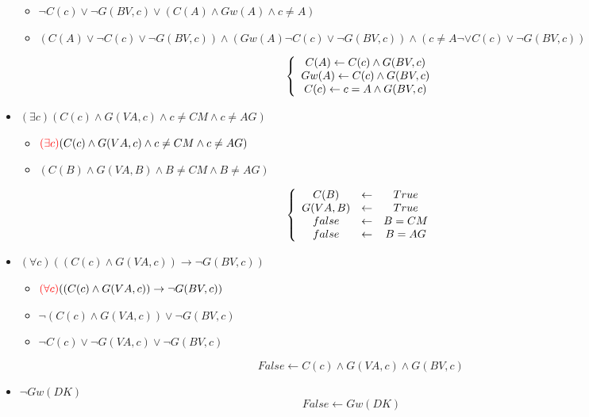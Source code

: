 \documentclass[alternative-exam.tex]{subfiles}
\begin{document}
\begin{itemize}
\begin{itemize}
\item $\neg C(c) \vee \neg G(BV,c) \vee (C(A) \wedge Gw(A) \wedge c \neq A)$

\item 
$(C(A)\vee \neg C(c) \vee \neg G(BV,c)) \wedge (Gw(A) \neg C(c) \vee \neg G(BV,c))\wedge (c \neq A\neg \vee C(c) \vee \neg G(BV,c))$

\[
\left\{
\begin{array}{c c c}
C(A)\leftarrow  C(c) \wedge  G(BV,c)\\
Gw(A) \leftarrow  C(c) \wedge  G(BV,c)\\
C(c) \leftarrow c = A \wedge G(BV,c)
\end{array}
\right.
\]
\end{itemize}

\item $(\exists c) (C(c) \wedge G(VA,c) \wedge c\neq CM \wedge c \neq AG)$
\begin{itemize}
\item ${\color{red}(\exists c)} (C(c) \wedge G(VA,c) \wedge c\neq CM \wedge c \neq AG)$

\item $(C(B) \wedge G(VA,B) \wedge B\neq CM \wedge B \neq AG)$

\[
\left\{
\begin{array}{c c c}
C(B) &\leftarrow& True\\
G(VA,B) &\leftarrow& True\\
false &\leftarrow& B = CM\\
false &\leftarrow& B = AG\\
\end{array}
\right.
\]
\end{itemize}

\item $(\forall c) ((C(c) \wedge G(VA,c)) \rightarrow \neg G(BV,c))$
\begin{itemize}
\item ${\color{red}(\forall c)} ((C(c) \wedge G(VA,c)) \rightarrow \neg G(BV,c))$

\item $\neg(C(c) \wedge G(VA,c)) \vee \neg G(BV,c)$

\item $\neg C(c) \vee \neg G(VA,c) \vee \neg G(BV,c)$

\[
False \leftarrow C(c) \wedge G(VA,c) \wedge G(BV,c)
\]
\end{itemize}

\item $\neg Gw(DK)$
\[
False \leftarrow Gw(DK)
\]
\end{itemize}
\end{document}
